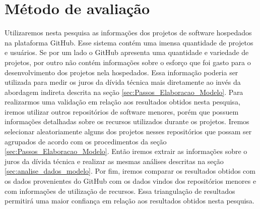  

\section{Método de avaliação}



Utilizaremos nesta pesquisa as informações dos projetos de software hospedados na plataforma GitHub. Esse sistema contém uma imensa quantidade de projetos e usuários. Se por um lado o GitHub apresenta uma quantidade e variedade de projetos, por outro não contém informações sobre o esforço que foi gasto para o desenvolvimento dos projetos nela hospedados. Essa informação poderia ser utilizada para medir os juros da dívida técnica mais diretamente ao invés da abordagem indireta descrita na seção \ref{sec:Passos_Elaboracao_Modelo}. Para realizarmos uma validação em relação aos resultados obtidos nesta pesquisa, iremos utilizar outros repositórios de software menores, porém que possuem informações detalhadas sobre os recursos utilizados durante os projetos. Iremos selecionar aleatoriamente alguns dos projetos nesses repositórios que possam ser agrupados de acordo com os procedimentos da seção \ref{sec:Passos_Elaboracao_Modelo}. Então iremos extrair as informações sobre o juros da dívida técnica e realizar as mesmas análises descritas na seção \ref{sec:analise_dados_modelo}. Por fim, iremos comparar os resultados obtidos com os dados provenientes do GitHub com os dados vindos dos repositórios menores e com informações de utilização de recursos. Essa triangulação de resultados permitirá uma maior confiança em relação aos resultados obtidos nesta pesquisa. 








